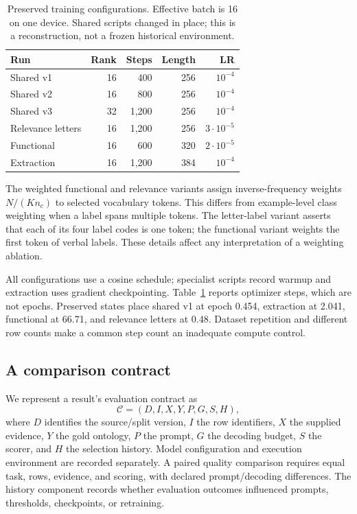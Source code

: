 \begin{table}[t]
\centering\small
\caption{Preserved training configurations. Effective batch is 16 on one device. Shared scripts changed in place; this is a reconstruction, not a frozen historical environment.}
\label{tab:train}
\setlength{\tabcolsep}{3pt}
\begin{tabular}{lrrrr}
\toprule
Run & Rank & Steps & Length & LR\\\midrule
Shared v1 &16&400&256&$10^{-4}$\\
Shared v2 &16&800&256&$10^{-4}$\\
Shared v3 &32&1,200&256&$10^{-4}$\\
Relevance letters &16&1,200&256&$3\cdot10^{-5}$\\
Functional &16&600&320&$2\cdot10^{-5}$\\
Extraction &16&1,200&384&$10^{-4}$\\\bottomrule
\end{tabular}
\end{table}

The weighted functional and relevance variants assign inverse-frequency weights $N/(Kn_c)$ to selected vocabulary tokens. This differs from example-level class weighting when a label spans multiple tokens. The letter-label variant asserts that each of its four label codes is one token; the functional variant weights the first token of verbal labels. These details affect any interpretation of a weighting ablation.

All configurations use a cosine schedule; specialist scripts record warmup and extraction uses gradient checkpointing. Table~\ref{tab:train} reports optimizer steps, which are not epochs. Preserved states place shared v1 at epoch 0.454, extraction at 2.041, functional at 66.71, and relevance letters at 0.48. Dataset repetition and different row counts make a common step count an inadequate compute control.

\subsection{A comparison contract}
We represent a result's evaluation contract as
\begin{equation}
\mathcal C=(D,I,X,Y,P,G,S,H),
\end{equation}
where $D$ identifies the source/split version, $I$ the row identifiers, $X$ the supplied evidence, $Y$ the gold ontology, $P$ the prompt, $G$ the decoding budget, $S$ the scorer, and $H$ the selection history. Model configuration and execution environment are recorded separately. A paired quality comparison requires equal task, rows, evidence, and scoring, with declared prompt/decoding differences. The history component records whether evaluation outcomes influenced prompts, thresholds, checkpoints, or retraining.

